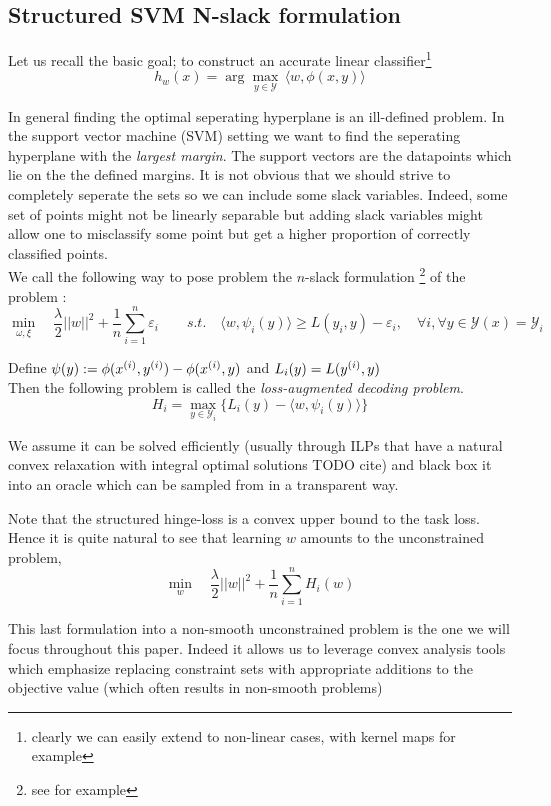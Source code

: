 \subsection{Structured SVM N-slack formulation}
Let us recall the basic goal; to construct an accurate linear
classifier\footnote{clearly we can easily extend to non-linear cases, with kernel maps for example}
\begin{equation}
  h_{w}(x)= \arg\max_{y\in \mathcal Y} \, \langle w, \phi(x,y)\rangle
\end{equation}

In general finding the optimal seperating hyperplane is an ill-defined problem.
In the support vector machine (SVM) setting we want to find the seperating
hyperplane with the \emph{largest margin}. The support vectors are the
datapoints which lie on the the defined margins. It is not obvious
that we should strive to completely seperate the sets so we can include some
slack variables. Indeed, some set of points might not be linearly separable but
adding slack variables might allow one to misclassify some point but get 
a higher proportion of correctly classified points.\\

We call the following way to pose problem the $n$-slack formulation
\footnote{see \citet{moguerzaSupportVectorMachines2006} for example} of the problem :
\begin{equation}
  \min_{\omega, \xi}\quad\frac{\lambda}{2}||w||^{2}+ \frac{1}{n}\sum_{i=1}^{n}\varepsilon_{i}
  \qquad \textit{s.t.} \quad \langle w, \psi_{i}(y)\rangle \geq L(y_{i},y)-
\varepsilon_{i},\quad\forall i ,\forall y \in\mathcal{Y}(x)=\mathcal{Y}_{i}
\end{equation}

Define $\psi(y) := \phi(x^{(i)},y^{(i)}) - \phi(x^{(i)},y)$ and $L_i(y) = L(y^{(i)}, y)$\\

Then the following problem is called the \emph{loss-augmented decoding problem}.
\begin{equation}
H_i = \max_{y\in\mathcal{Y}_{i}} \{L_{i}(y)- \langle w, \psi_{i}(y)\rangle\} 
\end{equation}

We assume it can be solved efficiently (usually through ILPs that have a natural
convex relaxation with integral optimal solutions TODO cite) and black box it
into an oracle which can be sampled from in a transparent way.

Note that the structured hinge-loss is a convex upper bound to the task loss.\\
Hence it is quite natural to see that  learning $w$ amounts to the unconstrained problem,
\begin{equation}
  \min_{w} \quad\frac{\lambda}{2}||w||^{2}+ \frac{1}{n}\sum_{i=1}^{n}H_{i}(w)
  \label{eq:svm-non-smooth}
\end{equation}

This last formulation into a non-smooth unconstrained problem is the one we will
focus throughout this paper. Indeed it allows us to leverage convex analysis
tools which emphasize replacing constraint sets with appropriate additions to
the objective value (which often results in non-smooth problems)
